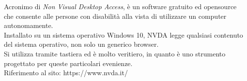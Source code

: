 Acronimo di \emph{Non Visual Desktop Access}, è un software gratuito ed opensource che consente alle persone con disabilità alla vista di utilizzare un computer autonomamente.\\ 
Installato su un sistema operativo Windows 10, NVDA legge qualsiasi contenuto del sistema operativo, non solo un generico browser.\\ 
Si utilizza tramite tastiera ed è molto veritiero, in quanto è uno strumento progettato per queste particolari evenienze.\\
Riferimento al sito: https://www.nvda.it/

\newpage